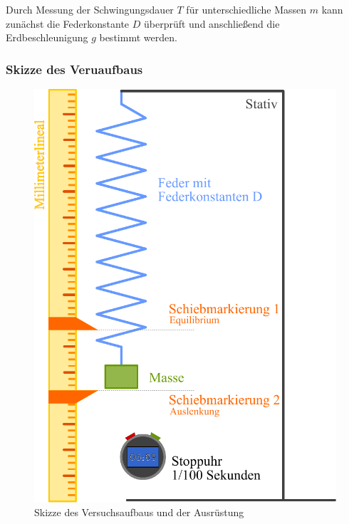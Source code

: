 Durch Messung der Schwingungsdauer $T$ für unterschiedliche Massen $m$ kann zunächst die Federkonstante $D$ überprüft und anschließend die Erdbeschleunigung $g$ bestimmt werden. 
\subsubsection*{Skizze des Veruaufbaus}
\begin{figure}[h!]
    \centering
    \includegraphics[width=\columnwidth]{img/11/Versuchsaufbau.pdf}
    \caption{Skizze des Versuchsaufbaus \newline und der Ausrüstung}
    \label{fig:versuchsaufbau}
\end{figure}
